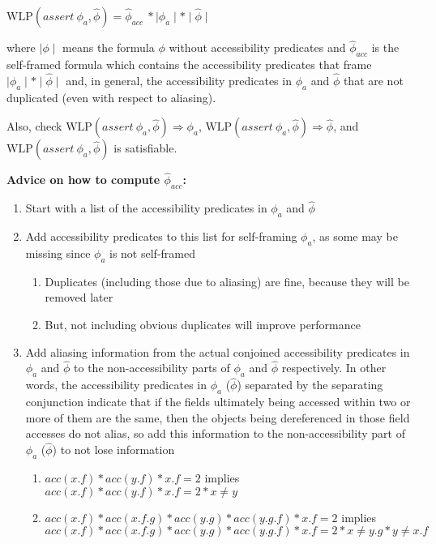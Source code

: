 \documentclass {article}
\newcommand{\fphi}{\widehat{\phi}}
\newcommand{\imp}{\Rightarrow}
\newcommand{\wlp}[2]{\text{WLP}(#1,#2)}
\begin{document}
\vspace{0.5cm}

$\wlp{assert\ \phi_a}{\fphi} = \fphi_{acc} \ \ast \mid \phi_a \mid \ast \mid \fphi \mid$


where $\mid \phi \mid$ means the formula $\phi$ without accessibility predicates and $\fphi_{acc}$ is the self-framed formula which contains the accessibility predicates that frame $\mid \phi_a \mid \ast \mid \fphi \mid$ and, in general, the accessibility predicates in $\phi_a$ and $\fphi$ that are not duplicated (even with respect to aliasing).

Also, check $\wlp{assert\ \phi_a}{\fphi} \imp \phi_a$, $\wlp{assert\ \phi_a}{\fphi} \imp \fphi$, and $\wlp{assert\ \phi_a}{\fphi}$ is satisfiable.

\textbf{Advice on how to compute $\fphi_{acc}$:}
\begin{enumerate}
\item Start with a list of the accessibility predicates in $\phi_a$ and $\fphi$
\item Add accessibility predicates to this list for self-framing $\phi_a$, as some may be missing since $\phi_a$ is not self-framed
	\begin{enumerate}
	\item Duplicates (including those due to aliasing) are fine, because they will be removed later
	\item But, not including obvious duplicates will improve performance
	\end{enumerate}
\item Add aliasing information from the actual conjoined accessibility predicates in $\phi_a$ and $\fphi$ to the non-accessibility parts of $\phi_a$ and $\fphi$ respectively. In other words, the accessibility predicates in $\phi_a$ ($\fphi$) separated by the separating conjunction indicate that if the fields ultimately being accessed within two or more of them are the same, then the objects being dereferenced in those field accesses do not alias, so add this information to the non-accessibility part of $\phi_a$ ($\fphi$) to not lose information
	\begin{enumerate}
	\item $acc(x.f) \ast acc(y.f) \ast x.f = 2$ implies $acc(x.f) \ast acc(y.f) \ast x.f = 2 \ast x \neq y$
	\item $acc(x.f) \ast acc(x.f.g) \ast acc(y.g) \ast acc(y.g.f) \ast x.f = 2$ implies \\ $acc(x.f) \ast acc(x.f.g) \ast acc(y.g) \ast acc(y.g.f) * x.f = 2 \ast x \neq y.g \ast y \neq x.f$

\end{enumerate}
\end{enumerate}
\end{document}
